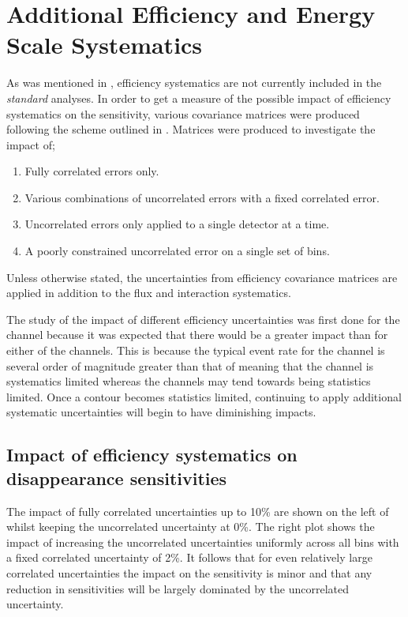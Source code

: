 \section{Additional Efficiency and Energy Scale Systematics}

As was mentioned in , efficiency systematics are not currently included in the \textit{standard} analyses. In order to get a measure of the possible impact of efficiency systematics on the sensitivity, various covariance matrices were produced following the scheme outlined in . Matrices were produced to investigate the impact of;
\begin{enumerate}
    \item Fully correlated errors only.
    \item Various combinations of uncorrelated errors with a fixed correlated error.
    \item Uncorrelated errors only applied to a single detector at a time.
    \item A poorly constrained uncorrelated error on a single set of bins.
\end{enumerate}
Unless otherwise stated, the uncertainties from efficiency covariance matrices are applied in addition to the flux and interaction systematics. 

The study of the impact of different efficiency uncertainties was first done for the \numu channel because it was expected that there would be a greater impact than for either of the \nue channels. This is because the typical event rate for the \numu channel is several order of magnitude greater than that of \nue meaning that the \numu channel is systematics limited whereas the \nue channels may tend towards being statistics limited. Once a contour becomes statistics limited, continuing to apply additional systematic uncertainties will begin to have diminishing impacts. 

\subsection{\texorpdfstring{Impact of efficiency systematics on \numu disappearance sensitivities}{Impact of efficiency systematics on numu disappearance sensitivities}}


The impact of fully correlated uncertainties up to 10\% are shown on the left of  whilst keeping the uncorrelated uncertainty at 0\%. The right plot shows the impact of increasing the uncorrelated uncertainties uniformly across all bins with a fixed correlated uncertainty of 2\%. It follows that for even relatively large correlated uncertainties the impact on the sensitivity is minor and that any reduction in sensitivities will be largely dominated by the uncorrelated uncertainty. 

